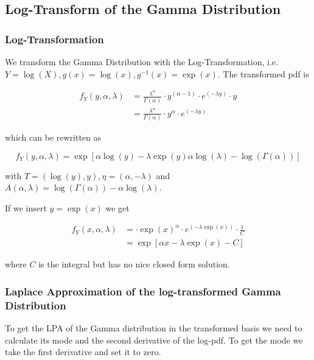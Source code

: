 \documentclass{article}
\begin{document}
\subsection{Log-Transform of the Gamma Distribution}

\subsubsection{Log-Transformation}

We transform the Gamma Distribution with the Log-Transformation, i.e. $Y = \log(X), g(x) = \log(x), g^{-1}(x) = \exp(x)$. The transformed pdf is

\begin{align}
f_Y(y, \alpha, \lambda) &= \frac{\lambda^\alpha}{\Gamma(\alpha)} \cdot y^{(\alpha - 1)} \cdot e^{(-\lambda y)} \cdot y \\ 
&=\frac{\lambda^\alpha}{\Gamma(\alpha)} \cdot y^{\alpha} \cdot e^{(-\lambda y)}
\end{align}

which can be rewritten as

\begin{equation}
f_Y(y, \alpha, \lambda) = \exp \left[\alpha \log(y) - \lambda \exp(y) \alpha \log(\lambda) - \log(\Gamma(\alpha))\right]	
\label{eq:exp_gamma_trans}
\end{equation}

with $T = (\log(y), y), \eta = (\alpha, -\lambda)$ and $A(\alpha, \lambda) = \log(\Gamma(\alpha)) - \alpha  \log(\lambda)$. 

If we insert $y = \exp(x)$ we get

\begin{align}
	f_Y(x, \alpha, \lambda) &= \cdot \exp(x)^{\alpha} \cdot e^{(-\lambda \exp(x))} \cdot \frac{1}{C}\\
	&= \exp\left[\alpha x - \lambda \exp(x) - C\right]
\end{align}

where $C$ is the integral but has no nice closed form solution.


\subsubsection{Laplace Approximation of the log-transformed Gamma Distribution}

To get the LPA of the Gamma distribution in the transformed basis we need to calculate its mode and the second derivative of the log-pdf. To get the mode we take the first derivative and set it to zero. 
\end{document}
